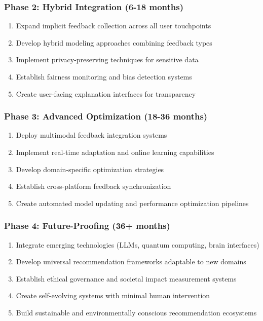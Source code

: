 \subsubsection{Phase 2: Hybrid Integration (6-18 months)}

\begin{enumerate}
    \item Expand implicit feedback collection across all user touchpoints
    \item Develop hybrid modeling approaches combining feedback types
    \item Implement privacy-preserving techniques for sensitive data
    \item Establish fairness monitoring and bias detection systems
    \item Create user-facing explanation interfaces for transparency
\end{enumerate}

\subsubsection{Phase 3: Advanced Optimization (18-36 months)}

\begin{enumerate}
    \item Deploy multimodal feedback integration systems
    \item Implement real-time adaptation and online learning capabilities
    \item Develop domain-specific optimization strategies
    \item Establish cross-platform feedback synchronization
    \item Create automated model updating and performance optimization pipelines
\end{enumerate}

\subsubsection{Phase 4: Future-Proofing (36+ months)}

\begin{enumerate}
    \item Integrate emerging technologies (LLMs, quantum computing, brain interfaces)
    \item Develop universal recommendation frameworks adaptable to new domains
    \item Establish ethical governance and societal impact measurement systems
    \item Create self-evolving systems with minimal human intervention
    \item Build sustainable and environmentally conscious recommendation ecosystems
\end{enumerate}


